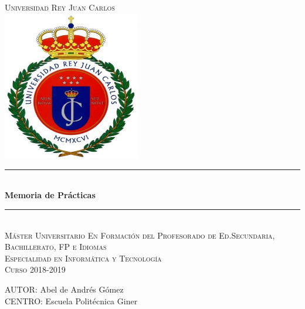 \documentclass[spanish,12pt, a4paper,twoside]{paper}
\begin{document}
\begin{titlepage}

\newcommand{\HRule}{\rule{\linewidth}{0.5mm}} %

\renewcommand{\baselinestretch}{1.5}

\center %
\vspace*{5pt}
\textsc{\huge Universidad Rey Juan Carlos }
\\[2cm]

\includegraphics[width=6cm]{recursos/escudo_urjc}
\\[2cm]


\HRule \\[0.4cm]
{ \huge \bfseries Memoria de Prácticas}\\[0.2cm] %
\HRule \\[1.5cm]

\textsc{\Large Máster Universitario En Formación del Profesorado de Ed.Secundaria, Bachillerato, FP e Idiomas }\\[0.7cm]
\textsc{\Large Especialidad en Informática y Tecnología }\\[1cm]
\textsc{\Large Curso 2018-2019}\\[2cm]

\begin{flushright}
\large
AUTOR: Abel de Andrés Gómez\\
CENTRO: Escuela Politécnica Giner\linebreak
\end{flushright}

\vspace{1cm}



\vfill %

\end{titlepage}
\end{document}
